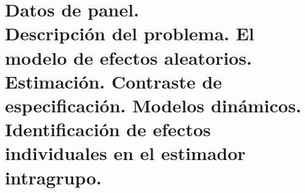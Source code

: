 \chapter[Datos de panel.]{Datos de panel. \\
\normalsize   Descripci\'on del problema. El modelo de efectos aleatorios. Estimaci\'on. Contraste de especificaci\'on. Modelos din\'amicos. Identificaci\'on de efectos individuales en el estimador intragrupo.}




